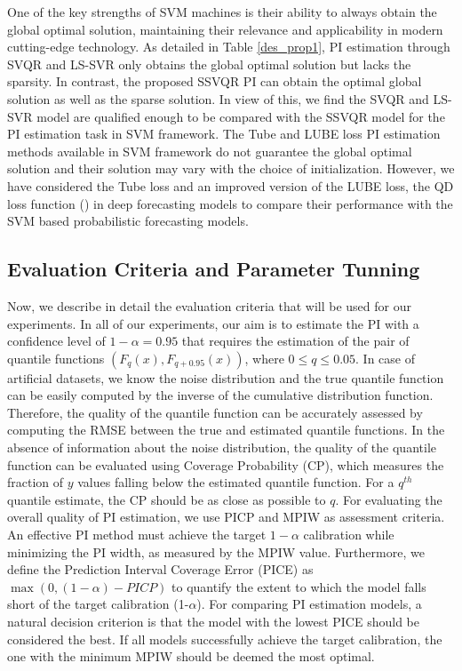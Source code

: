 \documentclass[10pt]{article} %
\begin{document}
One of the key strengths of SVM machines is their ability to always obtain the global optimal solution, maintaining their relevance and applicability in modern cutting-edge technology.
As detailed in Table \ref{des_prop1}, PI estimation through SVQR and LS-SVR only obtains the global optimal solution but lacks the sparsity. In contrast, the proposed SSVQR PI can obtain the optimal global solution as well as the sparse solution. In view of this, we find the SVQR and LS-SVR model are qualified enough to be compared with the SSVQR model for the PI estimation task in SVM framework. The Tube and LUBE loss PI estimation methods available in SVM framework do not guarantee the global optimal solution and their solution may vary with the choice of initialization. However, we have considered the Tube loss and an improved version of the LUBE loss, the QD loss function (\cite{pearce2018high}) in deep forecasting models to compare their performance with the SVM based probabilistic forecasting models. 


\subsection {Evaluation Criteria and Parameter Tunning }
 Now, we describe in detail the evaluation criteria that will be used for our experiments.  In all of our experiments, our aim is to estimate the PI with a confidence level of $1-\alpha = 0.95$ that requires the estimation of the pair of quantile functions $(F_q(x),F_{q+0.95}(x))$, where $0 \leq {q} \leq 0.05 $. In case of artificial datasets, we know the noise distribution and the true quantile function can be easily computed by the inverse of the cumulative distribution function. Therefore, the quality of the quantile function can be accurately assessed by computing the RMSE between the true and estimated quantile functions. In the absence of information about the noise distribution, the quality of the quantile function can be evaluated using Coverage Probability (CP), which measures the fraction of \( y \) values falling below the estimated quantile function. For a \( q^{th} \) quantile estimate, the CP should be as close as possible to \( q \).  For evaluating the  overall quality of PI estimation, we use PICP and MPIW as assessment criteria. An effective PI method must achieve the target \( 1-\alpha \) calibration while minimizing the PI width, as measured by the MPIW value.  Furthermore, we define the Prediction Interval Coverage Error (PICE) as \( \max(0, (1-\alpha) - PICP) \) to quantify the extent to which the model falls short of the target calibration (1-$\alpha$). For comparing PI estimation models, a natural decision criterion is that the model with the lowest PICE should be considered the best. If all models successfully achieve the target calibration, the one with the minimum MPIW should be deemed the most optimal.
\end{document}
